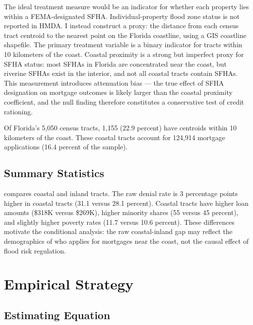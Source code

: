 \documentclass[12pt]{article}
\begin{document}
The ideal treatment measure would be an indicator for whether each property lies within a FEMA-designated SFHA. Individual-property flood zone status is not reported in HMDA. I instead construct a proxy: the distance from each census tract centroid to the nearest point on the Florida coastline, using a GIS coastline shapefile. The primary treatment variable is a binary indicator for tracts within 10 kilometers of the coast. Coastal proximity is a strong but imperfect proxy for SFHA status: most SFHAs in Florida are concentrated near the coast, but riverine SFHAs exist in the interior, and not all coastal tracts contain SFHAs. This measurement introduces attenuation bias --- the true effect of SFHA designation on mortgage outcomes is likely larger than the coastal proximity coefficient, and the null finding therefore constitutes a conservative test of credit rationing.

Of Florida's 5,050 census tracts, 1,155 (22.9 percent) have centroids within 10 kilometers of the coast. These coastal tracts account for 124,914 mortgage applications (16.4 percent of the sample).

\subsection{Summary Statistics}

 compares coastal and inland tracts. The raw denial rate is 3 percentage points higher in coastal tracts (31.1 versus 28.1 percent). Coastal tracts have higher loan amounts (\$318K versus \$269K), higher minority shares (55 versus 45 percent), and slightly higher poverty rates (11.7 versus 10.6 percent). These differences motivate the conditional analysis: the raw coastal-inland gap may reflect the demographics of who applies for mortgages near the coast, not the causal effect of flood risk regulation.




\section{Empirical Strategy}
\label{sec:strategy}

\subsection{Estimating Equation}
\end{document}
